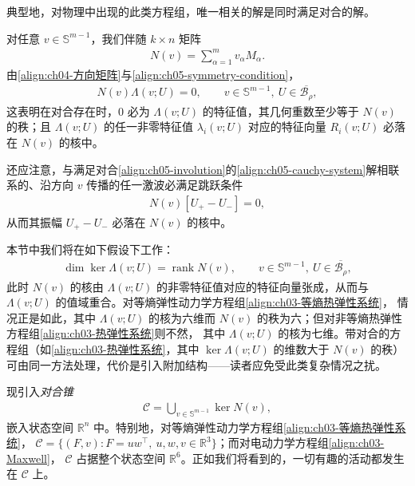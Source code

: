 \documentclass[../../main.tex]{subfiles}
\begin{document}
典型地，对物理中出现的此类方程组，唯一相关的解是同时满足对合的解。

对任意 $v\in\mathbb{S}^{m-1}$，我们伴随 $k\times n$ 矩阵
\begin{align}
N(v)=\sum_{\alpha=1}^{m}v_{\alpha}M_{\alpha}.\label{align:ch05-Nv-def}
\end{align}
由\eqref{align:ch04-方向矩阵}与\eqref{align:ch05-symmetry-condition}，
\begin{align}
N(v)\Lambda(v;U)=0,\qquad v\in\mathbb{S}^{m-1},\ U\in\overline{\mathscr{B}_{\rho}},\label{align:ch05-N-Lambda}
\end{align}
这表明在对合存在时，$0$ 必为 $\Lambda(v;U)$ 的特征值，其几何重数至少等于 $N(v)$ 的秩；且 $\Lambda(v;U)$ 的任一非零特征值 $\lambda_{i}(v;U)$ 对应的特征向量 $R_{i}(v;U)$ 必落在 $N(v)$ 的核中。

还应注意，与满足对合\eqref{align:ch05-involution}的\eqref{align:ch05-cauchy-system}解相联系的、沿方向 $v$ 传播的任一激波必满足跳跃条件
\begin{align}
N(v)[U_{+}-U_{-}]=0,\label{align:ch05-shock-jump}
\end{align}
从而其振幅 $U_{+}-U_{-}$ 必落在 $N(v)$ 的核中。

本节中我们将在如下假设下工作：
\begin{align}
\dim\ker\Lambda(v;U)=\operatorname{rank}N(v),\qquad v\in\mathbb{S}^{m-1},\ U\in\overline{\mathscr{B}_{\rho}},\label{align:ch05-kernel-rank}
\end{align}
此时 $N(v)$ 的核由 $\Lambda(v;U)$ 的非零特征值对应的特征向量张成，从而与 $\Lambda(v;U)$ 的值域重合。对等熵弹性动力学方程组\eqref{align:ch03-等熵热弹性系统}，
情况正是如此，其中 $\Lambda(v;U)$ 的核为六维而 $N(v)$ 的秩为六；但对非等熵热弹性方程组\eqref{align:ch03-热弹性系统}则不然，
其中 $\Lambda(v;U)$ 的核为七维。带对合的方程组（如\eqref{align:ch03-热弹性系统}，其中 $\ker\Lambda(v;U)$ 的维数大于 $N(v)$ 的秩）可由同一方法处理，代价是引入附加结构——读者应免受此类复杂情况之扰。

现引入\emph{对合锥}
\begin{align}
\mathscr{C}=\bigcup_{v\in\mathbb{S}^{m-1}}\ker N(v),\label{align:ch05-involution-cone}
\end{align}
嵌入状态空间 $\mathbb{R}^{n}$ 中。特别地，对等熵弹性动力学方程组\eqref{align:ch03-等熵热弹性系统}，
$\mathscr{C}=\{(F,v):F=uw^{\top},\ u,w,v\in\mathbb{R}^{3}\}$；而对电动力学方程组\eqref{align:ch03-Maxwell}，
$\mathscr{C}$ 占据整个状态空间 $\mathbb{R}^{6}$。正如我们将看到的，一切有趣的活动都发生在 $\mathscr{C}$ 上。
\end{document}
